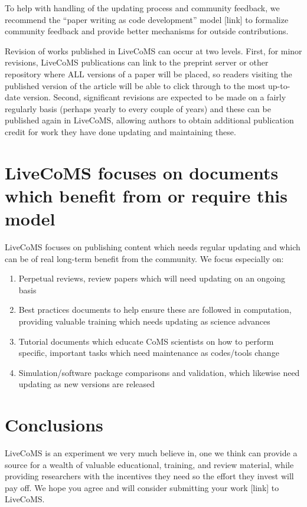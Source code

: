 \documentclass[9pt]{livecoms}
\begin{document}
To help with handling of the updating process and community feedback, we recommend the ``paper writing as code development'' model [link] to formalize community feedback and provide better mechanisms for outside contributions. 

Revision of works published in LiveCoMS can occur at two levels. 
First, for minor revisions, LiveCoMS publications can link to the preprint server or other repository where ALL versions of a paper will be placed, so readers visiting the published version of the article will be able to click through to the most up-to-date version.
Second, significant revisions are expected to be made on a fairly regularly basis (perhaps yearly to every couple of years) and these can be published again in LiveCoMS, allowing authors to obtain additional publication credit for work they have done updating and maintaining these. 

\section{LiveCoMS focuses on documents which benefit from or require this model}

LiveCoMS focuses on publishing content which needs regular updating and which can be of real long-term benefit from the community.
We focus especially on:
\begin{enumerate}
\item Perpetual reviews, review papers which will need updating on an ongoing basis
\item Best practices documents to help ensure these are followed in computation, providing valuable training which needs updating as science advances
\item Tutorial documents which educate CoMS scientists on how to perform specific, important tasks which need maintenance as codes/tools change
\item Simulation/software package comparisons and validation, which likewise need updating as new versions are released
\end{enumerate}

\section{Conclusions}

LiveCoMS is an experiment we very much believe in, one we think can provide a source for a wealth of valuable educational, training, and review material, while providing researchers with the incentives they need so the effort they invest will pay off.
We hope you agree and will consider submitting your work [link] to LiveCoMS.
\end{document}
